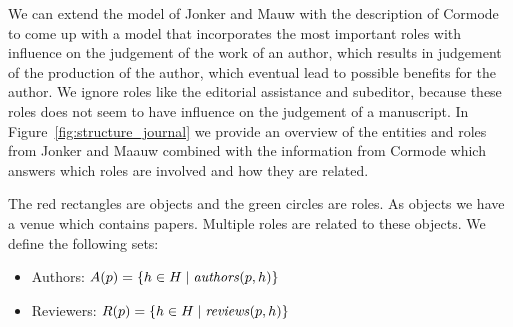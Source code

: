 \documentclass{ou-report}
\begin{document}
We can extend the model of Jonker and Mauw with the description of Cormode to 
come up 
with a model that incorporates the most important roles with influence on the 
judgement of the work of an author, which results in judgement of the production 
of the author, which eventual lead to possible benefits for the author. We 
ignore roles like the editorial assistance and subeditor, because these roles 
does not seem to have influence on the judgement of a manuscript. In 
Figure~\ref{fig:structure_journal} we provide an overview of the entities and 
roles from Jonker and Maauw combined with the information from Cormode which 
answers which roles are involved and how they are related.

The red rectangles are objects and the green circles are roles.
As objects we have a venue which contains papers. Multiple roles are related to these objects.
We define the following sets:
\begin{itemize}
    \item Authors: $A(p) = \{h \in H \mid \mathit{authors}(p, h)\}$
    \item Reviewers: $R(p) = \{h \in H \mid \mathit{reviews}(p, h)\}$
\end{itemize}


\end{document}
